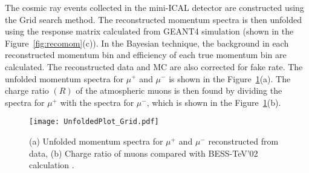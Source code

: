 The cosmic ray events collected in the mini-ICAL detector are
constructed using the Grid search method. The reconstructed momentum
spectra is then unfolded using the response matrix calculated from
GEANT4 simulation (shown in the Figure~\ref{fig:recomom}(c)).
In the Bayesian technique, the background in each reconstructed
momentum bin and efficiency of each true momentum bin are calculated.
The reconstructed data and MC are also corrected for fake rate.
The unfolded momentum spectra for $\mu^{+}$ and $\mu^{-}$ is shown in
the Figure~\ref{fig:unfolddata}(a).
The charge ratio $(R)$ of the atmospheric muons is then found by
dividing the spectra for $\mu^{+}$ with the spectra for $\mu^{-}$,
which is shown in the Figure~\ref{fig:unfolddata}(b).
\begin{figure}[h]
  \centering
  \texttt{[image: UnfoldedPlot\_Grid.pdf]}
  \caption{(a) Unfolded momentum spectra for $\mu^{+}$ and $\mu^{-}$
    reconstructed from data, (b) Charge ratio of muons compared
    with BESS-TeV'02 calculation \cite{bess2002}.}
  \label{fig:unfolddata}
\end{figure}


